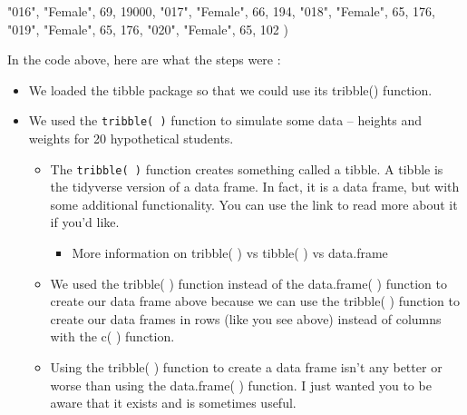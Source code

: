 \documentclass[
  letterpaper,
  DIV=11,
  numbers=noendperiod]{scrreprt}
\newenvironment{Shaded}{\begin{snugshade}}{\end{snugshade}}
\newcommand{\DecValTok}[1]{\textcolor[rgb]{0.68,0.00,0.00}{#1}}
\newcommand{\NormalTok}[1]{\textcolor[rgb]{0.00,0.23,0.31}{#1}}
\newcommand{\StringTok}[1]{\textcolor[rgb]{0.13,0.47,0.30}{#1}}
\providecommand{\tightlist}{%
  \setlength{\itemsep}{0pt}\setlength{\parskip}{0pt}}\usepackage{longtable,booktabs,array}
\begin{document}
\begin{Shaded}
\begin{Highlighting}[]
  \StringTok{"016"}\NormalTok{, }\StringTok{"Female"}\NormalTok{, }\DecValTok{69}\NormalTok{,     }\DecValTok{19000}\NormalTok{,}
  \StringTok{"017"}\NormalTok{, }\StringTok{"Female"}\NormalTok{, }\DecValTok{66}\NormalTok{,     }\DecValTok{194}\NormalTok{,}
  \StringTok{"018"}\NormalTok{, }\StringTok{"Female"}\NormalTok{, }\DecValTok{65}\NormalTok{,     }\DecValTok{176}\NormalTok{,}
  \StringTok{"019"}\NormalTok{, }\StringTok{"Female"}\NormalTok{, }\DecValTok{65}\NormalTok{,     }\DecValTok{176}\NormalTok{,}
  \StringTok{"020"}\NormalTok{, }\StringTok{"Female"}\NormalTok{, }\DecValTok{65}\NormalTok{,     }\DecValTok{102}
\NormalTok{)}
\end{Highlighting}
\end{Shaded}

In the code above, here are what the steps were :

\begin{itemize}
\item
  We loaded the tibble package so that we could use its tribble()
  function.
\item
  We used the \texttt{tribble(\ )} function to simulate some data --
  heights and weights for 20 hypothetical students.

  \begin{itemize}
  \item
    The \texttt{tribble(\ )} function creates something called a tibble.
    A tibble is the tidyverse version of a data frame. In fact, it is a
    data frame, but with some additional functionality. You can use the
    link to read more about it if you'd like.

    \begin{itemize}
    \tightlist
    \item
      More information on tribble( ) vs tibble( ) vs data.frame
    \end{itemize}
  \item
    We used the tribble( ) function instead of the data.frame( )
    function to create our data frame above because we can use the
    tribble( ) function to create our data frames in rows (like you see
    above) instead of columns with the c( ) function.
  \item
    Using the tribble( ) function to create a data frame isn't any
    better or worse than using the data.frame( ) function. I just wanted
    you to be aware that it exists and is sometimes useful.
  \end{itemize}
\end{itemize}
\end{document}
